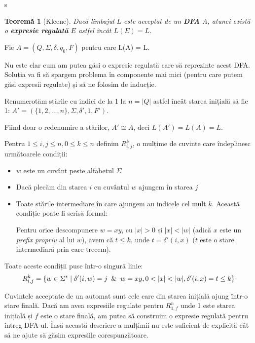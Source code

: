 \documentclass[a4paper, 12pt]{article}
\newtheorem*{theorem}{Teoremă}
\begin{document}
s

\thispagestyle{fancy}

\begin{theorem}[Kleene]
Dacă limbajul \(L\) este acceptat de un \textbf{DFA} A, atunci există o \textbf{expresie regulată} \(E\) astfel încât \(L(E) = L\).
\end{theorem}

Fie \(A = (Q, \Sigma, \delta, q_0, F)\) pentru care L(A) = L.

Nu este clar cum am putea găsi o expresie regulată care să reprezinte acest DFA.
Soluția va fi să spargem problema în componente mai mici (pentru care putem găsi expresii regulate)
și să ne folosim de inducție.

\bigskip

Renumerotăm stările cu indici de la 1 la \(n = |Q|\) astfel încât starea inițială să fie 1:
\(A' = (\{1, 2, \dots, n\}, \Sigma, \delta', 1, F')\).

Fiind doar o redenumire a stărilor, \(A' \cong A\), deci \(L(A') = L(A) = L\).

\bigskip

Pentru \(1 \leq i, j \leq n, 0 \leq k \leq n\) definim \(R_{i, j}^{k}\), o mulțime de cuvinte care îndeplinesc următoarele condiții:
\begin{itemize}
    \item \(w\) este un cuvânt peste alfabetul \(\Sigma\)
    \item Dacă plecăm din starea \(i\) cu cuvântul \(w\) ajungem în starea \(j\)
    \item Toate stările intermediare în care ajungem au indicele cel mult \(k\).
    Această condiție poate fi scrisă formal:
    
    Pentru orice descompunere \(w = xy\), cu \(|x| > 0\) și \(|x| < |w|\) (adică \(x\) este un \emph{prefix propriu} al lui \(w\)),
    avem că \(t \leq k\), unde \(t = \delta'(i, x)\) (\(t\) este o stare intermediară prin care trecem).
\end{itemize}

Toate aceste condiții puse într-o singură linie:
\[
    R_{i, j}^{k} = \{
    w \in \Sigma^{*} \mid \delta'(i, w) = j
    \And w = xy, 0 < |x| < |w|, \delta'(i, x) = t \leq k
    \}
\]

Cuvintele acceptate de un automat sunt cele care din starea inițială ajung într-o stare finală.
Dacă am avea expresiile regulate pentru \(R_{1, f}^{n}\) unde 1 este starea inițială și \(f\) este o stare finală, am putea să construim o expresie regulată pentru întreg DFA-ul.
Însă această descriere a mulțimii nu este suficient de explicită cât să ne ajute să găsim expresiile corespunzătoare.
\end{document}
